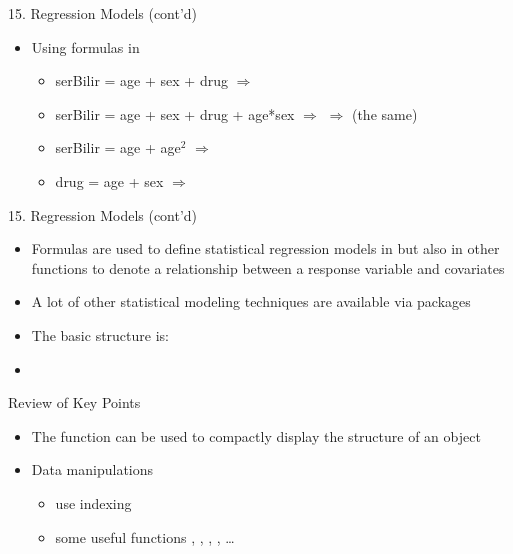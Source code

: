 \documentclass[14pt, aspectratio=169, sectionpage=simple, xclolor=table]{beamer}
\begin{document}
\begin{frame}[fragile]{15. Regression Models (cont'd)}
\begin{itemize}
\item Using formulas in \R
\begin{itemize}
\item serBilir = age + sex + drug \nl$\Rightarrow$ 
\nl
\item serBilir = age + sex + drug + age*sex \nl$\Rightarrow$ \nl
$\Rightarrow$  (the same)
\nl
\item serBilir = age + age$^2$ \nl$\Rightarrow$ 
\nl
\item drug = age + sex \nl$\Rightarrow$ 
\nl
\end{itemize}
\end{itemize}
\end{frame}
\begin{frame}[fragile]{15. Regression Models (cont'd)}
\begin{itemize}
	\item Formulas are used to define statistical regression models in \R but also in
	other functions to denote a relationship between a response variable and covariates
	\nl
	\item A lot of other statistical modeling techniques are available via \R packages
	\nl
	\item The basic structure is:\\\hspace{2cm}
\end{itemize}
\end{frame}
\begin{frame}[lbslide]{}
\begin{itemize}
	\item {}
\end{itemize}
\end{frame}
\begin{frame}{Review of Key Points}
\begin{itemize}
\item The  function can be used to compactly display the structure of an \R object
\nl
\item Data manipulations
\begin{itemize}
\item use indexing
\item some useful functions , , , , \dots
\end{itemize}
\end{itemize}
\end{frame}
\end{document}
